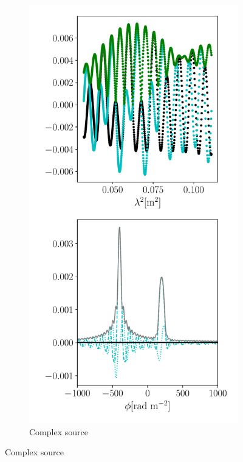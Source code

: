 \documentclass[xetex,aspectratio=169]{beamer}
\begin{document}
\begin{frame}
\begin{figure}
\begin{subfigure}{0.2\textwidth}
		\end{subfigure}
		\begin{subfigure}{0.2\textwidth}
			\includegraphics[width=\textwidth]{figures/sources/mixed_source.pdf}
			\caption{Complex source}
		\end{subfigure}
	\end{figure}

\end{frame}
\end{document}
